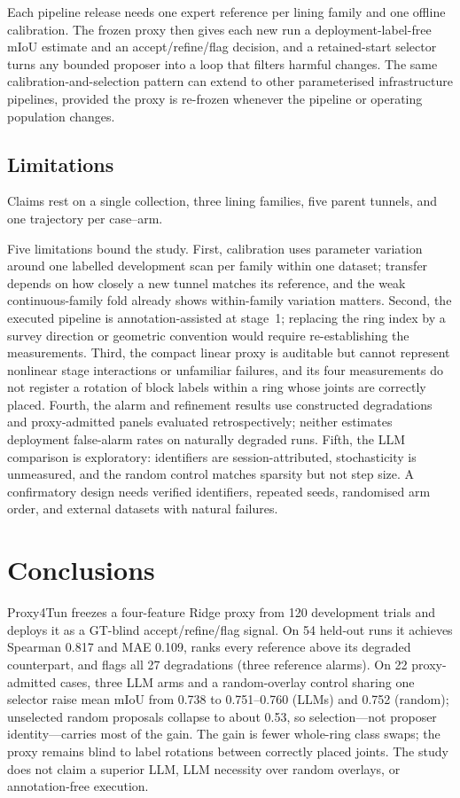 \documentclass[a4paper,fleqn]{cas-dc}
\begin{document}
Each pipeline release needs one expert reference per lining family and one offline calibration. The frozen proxy then gives each new run a deployment-label-free mIoU estimate and an accept/refine/flag decision, and a retained-start selector turns any bounded proposer into a loop that filters harmful changes. The same calibration-and-selection pattern can extend to other parameterised infrastructure pipelines, provided the proxy is re-frozen whenever the pipeline or operating population changes.

\subsection{Limitations}\label{sec:limitations}

Claims rest on a single collection, three lining families, five parent tunnels, and one trajectory per case--arm.

Five limitations bound the study. First, calibration uses parameter variation around one labelled development scan per family within one dataset; transfer depends on how closely a new tunnel matches its reference, and the weak continuous-family fold already shows within-family variation matters. Second, the executed pipeline is annotation-assisted at stage~1; replacing the ring index by a survey direction or geometric convention would require re-establishing the measurements. Third, the compact linear proxy is auditable but cannot represent nonlinear stage interactions or unfamiliar failures, and its four measurements do not register a rotation of block labels within a ring whose joints are correctly placed. Fourth, the alarm and refinement results use constructed degradations and proxy-admitted panels evaluated retrospectively; neither estimates deployment false-alarm rates on naturally degraded runs. Fifth, the LLM comparison is exploratory: identifiers are session-attributed, stochasticity is unmeasured, and the random control matches sparsity but not step size. A confirmatory design needs verified identifiers, repeated seeds, randomised arm order, and external datasets with natural failures.

\section{Conclusions}\label{sec:conclusions}

Proxy4Tun freezes a four-feature Ridge proxy from 120 development trials and deploys it as a GT-blind accept/refine/flag signal. On 54 held-out runs it achieves Spearman 0.817 and MAE 0.109, ranks every reference above its degraded counterpart, and flags all 27 degradations (three reference alarms). On 22 proxy-admitted cases, three LLM arms and a random-overlay control sharing one selector raise mean mIoU from 0.738 to 0.751--0.760 (LLMs) and 0.752 (random); unselected random proposals collapse to about 0.53, so selection---not proposer identity---carries most of the gain. The gain is fewer whole-ring class swaps; the proxy remains blind to label rotations between correctly placed joints. The study does not claim a superior LLM, LLM necessity over random overlays, or annotation-free execution.
\end{document}
